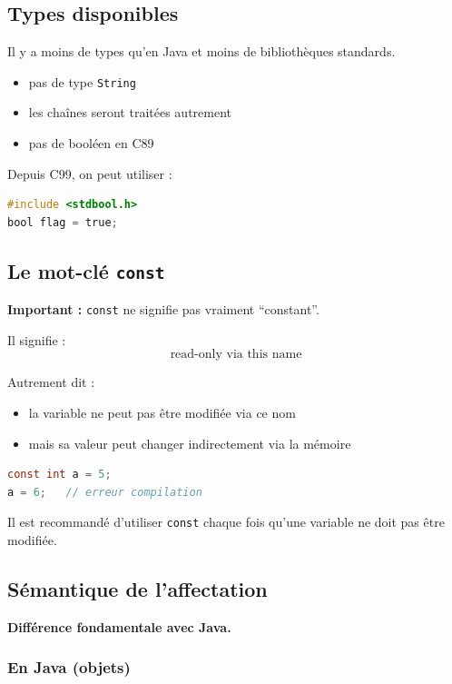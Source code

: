 \subsection{Types disponibles}

Il y a moins de types qu’en Java et moins de bibliothèques standards.

\begin{itemize}
    \item pas de type \texttt{String}
    \item les chaînes seront traitées autrement
    \item pas de booléen en C89
\end{itemize}

Depuis C99, on peut utiliser :

\begin{lstlisting}[language=C]
#include <stdbool.h>
bool flag = true;
\end{lstlisting}

\subsection{Le mot-clé \texttt{const}}

\textbf{Important :} \texttt{const} ne signifie pas vraiment “constant”.

Il signifie :
\[
\text{read-only via this name}
\]

Autrement dit :

\begin{itemize}
    \item la variable ne peut pas être modifiée via ce nom
    \item mais sa valeur peut changer indirectement via la mémoire
\end{itemize}

\begin{lstlisting}[language=C]
const int a = 5;
a = 6;   // erreur compilation
\end{lstlisting}

Il est recommandé d’utiliser \texttt{const} chaque fois qu’une variable ne doit pas être modifiée.

\subsection{Sémantique de l’affectation}

\textbf{Différence fondamentale avec Java.}

\subsubsection{En Java (objets)}

